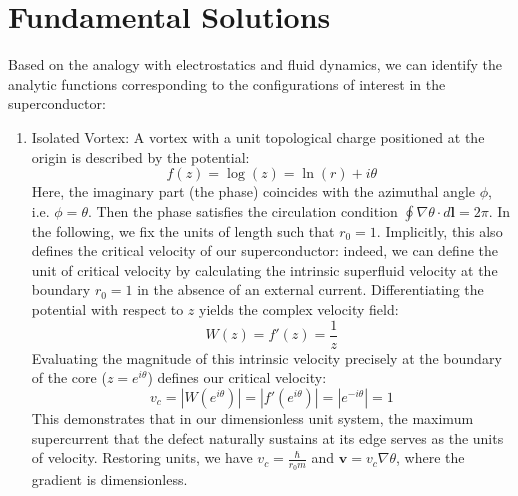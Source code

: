 \documentclass[english,binding=0.6cm,noexaminfo]{sapthesis}
\begin{document}
\section{Fundamental Solutions}
Based on the analogy with electrostatics and fluid dynamics, we can identify the analytic functions corresponding to the configurations of interest in the superconductor:

\begin{enumerate}
    \item Isolated Vortex: A vortex with a unit topological charge positioned at the origin is described by the potential:
    \begin{equation}
        f(z) = \log(z) = \ln(r) + i\theta
    \end{equation}
    Here, the imaginary part (the phase) coincides with the azimuthal angle $\phi$, i.e. $\phi=\theta $. Then the phase satisfies the circulation condition $\oint \nabla \theta \cdot d\mathbf{l} = 2\pi$. In the following, we fix the units of length such that $r_0=1$. Implicitly, this also defines the critical velocity of our superconductor: indeed, we can define the unit of critical velocity by calculating the intrinsic superfluid velocity at the boundary $r_0=1$ in the absence of an external current. 
    Differentiating the potential with respect to $z$ yields the complex velocity field:
    $$W(z)=f'(z) = \frac{1}{z}$$
    Evaluating the magnitude of this intrinsic velocity precisely at the boundary of the core ($z = e^{i\theta}$) defines our critical velocity:        
    \begin{equation}
    v_c=|W(e^{i\theta})| = \left| f'(e^{i\theta}) \right| = \left| e^{-i\theta} \right| = 1
    \label{criticalvelocity}
    \end{equation}
    This demonstrates that in our dimensionless unit system, the maximum supercurrent that the defect naturally sustains at its edge serves as the units of velocity. 
    Restoring units, we have $v_c=\frac{\hbar}{r_0m}$ and $\mathbf{v}=v_c \nabla \theta$, where the gradient is dimensionless.
    

\end{enumerate}
\end{document}
